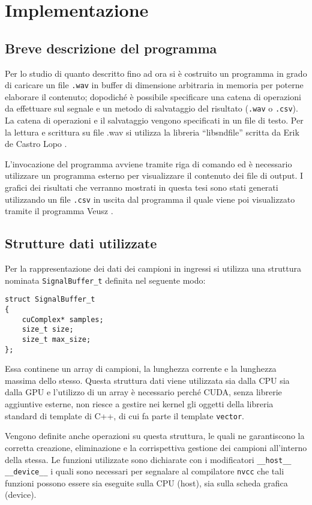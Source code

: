 \chapter{Implementazione}
\label{cap:implementazione}

\section{Breve descrizione del programma}
Per lo studio di quanto descritto fino ad ora si è costruito un programma in grado di caricare un file \lstinline{.wav} in buffer di dimensione arbitraria in memoria per poterne elaborare il contenuto; dopodiché è possibile specificare una catena di operazioni da effettuare sul segnale e un metodo di salvataggio del risultato (\lstinline{.wav} o \lstinline{.csv}). La catena di operazioni e il salvataggio vengono specificati in un file di testo. Per la lettura e scrittura su file .wav si utilizza la libreria ``libsndfile'' scritta da Erik de Castro Lopo \cite{libsndfile}.

L'invocazione del programma avviene tramite riga di comando ed è necessario utilizzare un programma esterno per visualizzare il contenuto dei file di output. I grafici dei risultati che verranno mostrati in questa tesi sono stati generati utilizzando un file \lstinline{.csv} in uscita dal programma il quale viene poi visualizzato tramite il programma Veusz \cite{veusz}.

\section{Strutture dati utilizzate}

Per la rappresentazione dei dati dei campioni in ingressi si utilizza una struttura nominata \lstinline{SignalBuffer_t} definita nel seguente modo:

\begin{lstlisting}
struct SignalBuffer_t
{
    cuComplex* samples;
    size_t size;
    size_t max_size;
};
\end{lstlisting}

Essa continene un array di campioni, la lunghezza corrente e la lunghezza massima dello stesso. Questa struttura dati viene utilizzata sia dalla CPU sia dalla GPU e l'utilizzo di un array è necessario perché CUDA, senza librerie aggiuntive esterne, non riesce a gestire nei kernel gli oggetti della libreria standard di template di C++, di cui fa parte il template \lstinline{vector}.

Vengono definite anche operazioni su questa struttura, le quali ne garantiscono la corretta creazione, eliminazione e la corrispettiva gestione dei campioni all'interno della stessa. Le funzioni utilizzate sono dichiarate con i modificatori \lstinline{__host__ __device__} i quali sono necessari per segnalare al compilatore \lstinline{nvcc} che tali funzioni possono essere sia eseguite sulla CPU (host), sia sulla scheda grafica (device).

